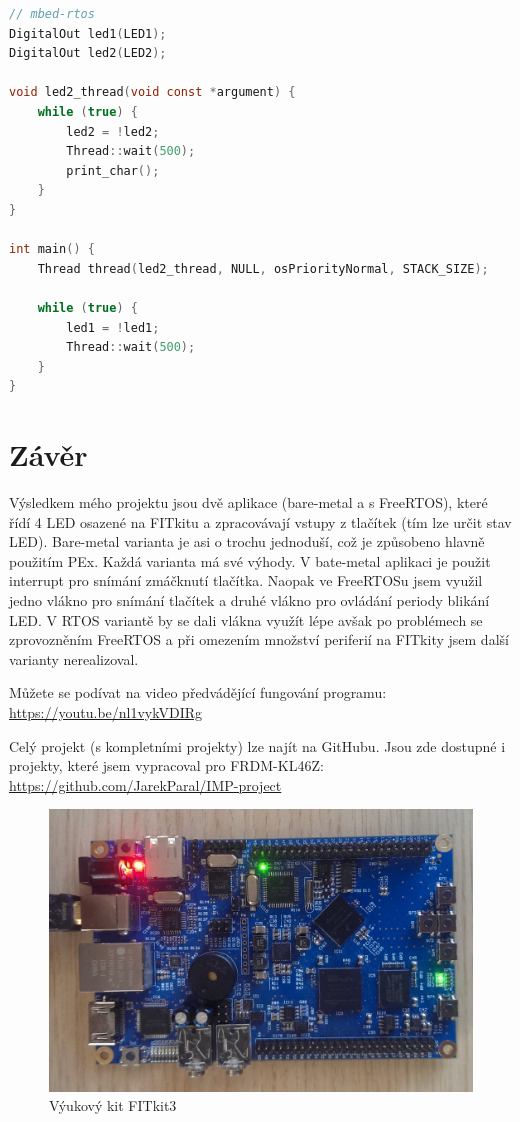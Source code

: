 \documentclass[a4paper]{article}
\begin{document}
\begin{lstlisting}[language=c]
// mbed-rtos
DigitalOut led1(LED1);
DigitalOut led2(LED2);

void led2_thread(void const *argument) {
    while (true) {
        led2 = !led2;
        Thread::wait(500);
        print_char();
    }
}

int main() {
    Thread thread(led2_thread, NULL, osPriorityNormal, STACK_SIZE);

    while (true) {
        led1 = !led1;
        Thread::wait(500);
    }
}

\end{lstlisting}

\newpage

\section{Závěr}
Výsledkem mého projektu jsou dvě aplikace (bare-metal a s FreeRTOS), které řídí 4 LED osazené na FITkitu a zpracovávají vstupy z tlačítek (tím lze určit stav LED). Bare-metal varianta je asi o trochu jednoduší, což je způsobeno hlavně použitím PEx. Každá varianta má své výhody. V bate-metal aplikaci je použit interrupt pro snímání zmáčknutí tlačítka. Naopak ve FreeRTOSu jsem využil jedno vlákno pro snímání tlačítek a druhé vlákno pro ovládání periody blikání LED. V RTOS variantě by se dali vlákna využít lépe avšak po problémech se zprovozněním FreeRTOS a při omezením množství periferií na FITkity jsem další varianty nerealizoval.

Můžete se podívat na video předvádějící fungování programu: \url{https://youtu.be/nl1vykVDIRg}

Celý projekt (s kompletními projekty) lze najít na GitHubu. Jsou zde dostupné i projekty, které jsem vypracoval pro FRDM-KL46Z: \url{https://github.com/JarekParal/IMP-project}


\begin{figure}[h]
	\includegraphics[width=\textwidth]{fitkit3-foto.jpg}
	\caption{Výukový kit FITkit3}
	\label{fitkit3-foto}
\end{figure}
\end{document}
